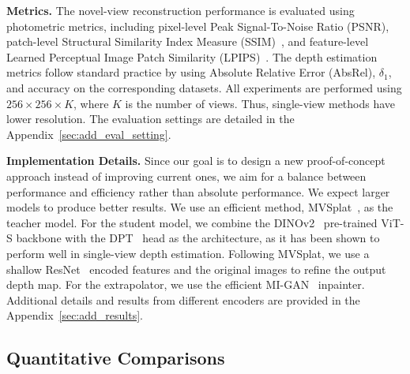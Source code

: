 \documentclass{article} %
\begin{document}
\textbf{Metrics.} The novel-view reconstruction performance is evaluated using photometric metrics, including pixel-level Peak Signal-To-Noise Ratio (PSNR), patch-level Structural Similarity Index Measure (SSIM)~\citep{wang2004image}, and feature-level Learned Perceptual Image Patch Similarity 
 (LPIPS)~\citep{zhang2018unreasonable}. The depth estimation metrics follow standard practice by using Absolute Relative Error (AbsRel), $\delta_1$, and accuracy on the corresponding datasets. All experiments are performed using $256\times 256\times K$, where $K$ is the number of views. Thus, single-view methods have lower resolution. The evaluation settings are detailed in the Appendix~\ref{sec:add_eval_setting}.

\textbf{Implementation Details.} Since our goal is to design a new proof-of-concept approach instead of improving current ones, we aim for a balance between performance and efficiency rather than absolute performance. We expect larger models to produce better results. We use an efficient method, MVSplat~\citep{chen2024mvsplat}, as the teacher model. For the student model, we combine the DINOv2~\citep{oquab2023dinov2} pre-trained ViT-S backbone with the DPT~\citep{ranftl2021vision} head as the architecture, as it has been shown to perform well in single-view depth estimation. Following MVSplat, we use a shallow ResNet~\citep{he2016deep} encoded features and the original images to refine the output depth map. For the extrapolator, we use the efficient MI-GAN~\citep{sargsyan2023mi} inpainter. Additional details and results from different encoders are provided in the Appendix~\ref{sec:add_results}.


\subsection{Quantitative Comparisons}


\end{document}
